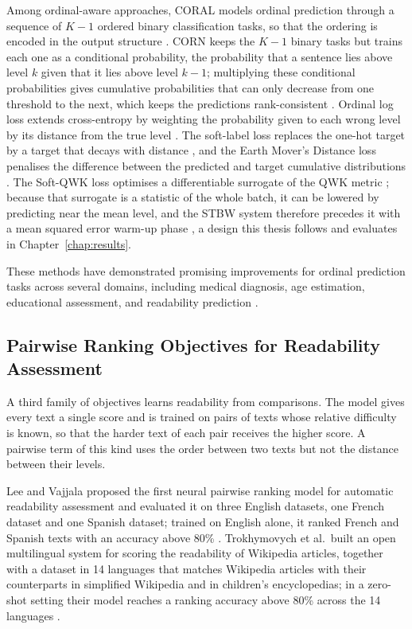Among ordinal-aware approaches, CORAL models ordinal prediction through a sequence of $K{-}1$ ordered binary classification tasks, so that the ordering is encoded in the output structure \cite{cao2020coral}. CORN keeps the $K{-}1$ binary tasks but trains each one as a conditional probability, the probability that a sentence lies above level $k$ given that it lies above level $k-1$; multiplying these conditional probabilities gives cumulative probabilities that can only decrease from one threshold to the next, which keeps the predictions rank-consistent \cite{shi2023deep}. Ordinal log loss extends cross-entropy by weighting the probability given to each wrong level by its distance from the true level \cite{castagnos2022ordinal}. The soft-label loss replaces the one-hot target by a target that decays with distance \cite{bertinetto2020soft}, and the Earth Mover's Distance loss penalises the difference between the predicted and target cumulative distributions \cite{hou2017emd}. The Soft-QWK loss optimises a differentiable surrogate of the QWK metric \cite{delatorre2018wkl,diaz2019softlabels}; because that surrogate is a statistic of the whole batch, it can be lowered by predicting near the mean level, and the STBW system therefore precedes it with a mean squared error warm-up phase \cite{trigui2025stbw}, a design this thesis follows and evaluates in Chapter~\ref{chap:results}.

These methods have demonstrated promising improvements for ordinal prediction tasks across several domains, including medical diagnosis, age estimation, educational assessment, and readability prediction \cite{castagnos2022ordinal}.

\subsection{Pairwise Ranking Objectives for Readability Assessment}
\label{subsec:pairwise_ranking}

A third family of objectives learns readability from comparisons. The model gives every text a single score and is trained on pairs of texts whose relative difficulty is known, so that the harder text of each pair receives the higher score. A pairwise term of this kind uses the order between two texts but not the distance between their levels.

Lee and Vajjala proposed the first neural pairwise ranking model for automatic readability assessment and evaluated it on three English datasets, one French dataset and one Spanish dataset; trained on English alone, it ranked French and Spanish texts with an accuracy above 80\% \cite{lee2022neural}. Trokhymovych et al.\ built an open multilingual system for scoring the readability of Wikipedia articles, together with a dataset in 14 languages that matches Wikipedia articles with their counterparts in simplified Wikipedia and in children's encyclopedias; in a zero-shot setting their model reaches a ranking accuracy above 80\% across the 14 languages \cite{trokhymovych2024open}.

